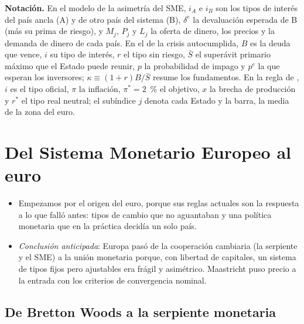 \documentclass[11pt]{article}
\begin{document}
\begin{anotaciones}
\textbf{Notación.} En el modelo de la asimetría del SME, $i_A$ e $i_B$ son los tipos de interés del país ancla (A) y de otro país del sistema (B), $\delta^e$ la devaluación esperada de B (más su prima de riesgo), y $M_j$, $P_j$ y $L_j$ la oferta de dinero, los precios y la demanda de dinero de cada país. En el de la crisis autocumplida, $B$ es la deuda que vence, $i$ su tipo de interés, $r$ el tipo sin riesgo, $\bar S$ el superávit primario máximo que el Estado puede reunir, $p$ la probabilidad de impago y $p^e$ la que esperan los inversores; $\kappa\equiv(1+r)B/\bar S$ resume los fundamentos. En la regla de , $i$ es el tipo oficial, $\pi$ la inflación, $\pi^*=2$~\% el objetivo, $x$ la brecha de producción y $r^*$ el tipo real neutral; el subíndice $j$ denota cada Estado y la barra, la media de la zona del euro.
\end{anotaciones}

\section{Del Sistema Monetario Europeo al euro}\label{sec:origen}

\begin{itemize}
\item Empezamos por el origen del euro, porque sus reglas actuales son la respuesta a lo que falló antes: tipos de cambio que no aguantaban y una política monetaria que en la práctica decidía un solo país.
\item \emph{Conclusión anticipada}: Europa pasó de la cooperación cambiaria (la serpiente y el SME) a la unión monetaria porque, con libertad de capitales, un sistema de tipos fijos pero ajustables era frágil y asimétrico. Maastricht puso precio a la entrada con los criterios de convergencia nominal.
\end{itemize}

\subsection{De Bretton Woods a la serpiente monetaria}\label{sec:serpiente}
\end{document}
